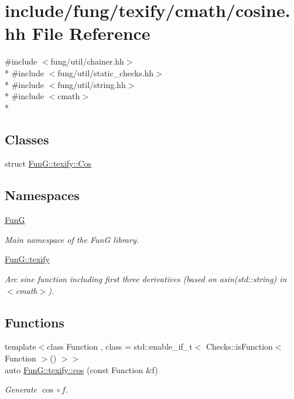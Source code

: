 \hypertarget{texify_2cmath_2cosine_8hh}{\section{include/fung/texify/cmath/cosine.hh File Reference}
\label{texify_2cmath_2cosine_8hh}
}
{\ttfamily \#include $<$fung/util/chainer.\-hh$>$}\\*
{\ttfamily \#include $<$fung/util/static\-\_\-checks.\-hh$>$}\\*
{\ttfamily \#include $<$fung/util/string.\-hh$>$}\\*
{\ttfamily \#include $<$cmath$>$}\\*
\subsection*{Classes}
\begin{DoxyCompactItemize}
\item 
struct \hyperlink{structFunG_1_1texify_1_1Cos}{Fun\-G\-::texify\-::\-Cos}
\end{DoxyCompactItemize}
\subsection*{Namespaces}
\begin{DoxyCompactItemize}
\item 
\hyperlink{namespaceFunG}{Fun\-G}
\begin{DoxyCompactList}\small\item\em Main namespace of the Fun\-G library. \end{DoxyCompactList}\item 
\hyperlink{namespaceFunG_1_1texify}{Fun\-G\-::texify}
\begin{DoxyCompactList}\small\item\em Arc sine function including first three derivatives (based on asin(std\-::string) in $<$cmath$>$). \end{DoxyCompactList}\end{DoxyCompactItemize}
\subsection*{Functions}
\begin{DoxyCompactItemize}
\item 
{\footnotesize template$<$class Function , class  = std\-::enable\-\_\-if\-\_\-t$<$ Checks\-::is\-Function$<$ Function $>$() $>$$>$ }\\auto \hyperlink{group__TexifyCMathGroup_gabbc13b57ec7a869d087fb33109faa98e}{Fun\-G\-::texify\-::cos} (const Function \&f)
\begin{DoxyCompactList}\small\item\em Generate $ \cos\circ f $. \end{DoxyCompactList}\end{DoxyCompactItemize}
